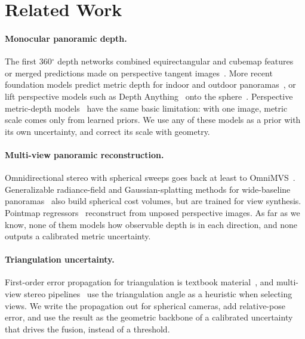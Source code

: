 \section{Related Work}
\label{sec:related}

\paragraph{Monocular panoramic depth.}
The first 360$^\circ$ depth networks combined equirectangular and cubemap
features~\cite{wang2020bifuse,jiang2021unifuse,li2022omnifusion} or merged predictions made on
perspective tangent images~\cite{rey2022360monodepth}. More recent foundation models predict metric
depth for indoor and outdoor panoramas~\cite{lin2026dap,da360}, or lift perspective models such as
Depth Anything~\cite{yang2024depthv2} onto the sphere~\cite{pager2026}. Perspective metric-depth
models~\cite{yin2023metric3d,piccinelli2024unidepth,bochkovskii2025depthpro} have the same basic
limitation: with one image, metric scale comes only from learned priors. We use any of these models as
a prior with its own uncertainty, and correct its scale with geometry.

\paragraph{Multi-view panoramic reconstruction.}
Omnidirectional stereo with spherical sweeps goes back at least to OmniMVS~\cite{won2019omnimvs}.
Generalizable radiance-field and Gaussian-splatting methods for wide-baseline
panoramas~\cite{chen2023panogrf,chen2025splatter360,zhang2024pansplat} also build spherical cost
volumes, but are trained for view synthesis. Pointmap regressors~\cite{wang2024dust3r,leroy2024mast3r,wang2025vggt}
reconstruct from unposed perspective images. As far as we know, none of them models how observable
depth is in each direction, and none outputs a calibrated metric uncertainty.

\paragraph{Triangulation uncertainty.}
First-order error propagation for triangulation is textbook
material~\cite{hartley2003multiple,forstner2016photogrammetric}, and multi-view stereo
pipelines~\cite{schoenberger2016mvs} use the triangulation angle as a heuristic when selecting views.
We write the propagation out for spherical cameras, add relative-pose error, and use the result as the
geometric backbone of a calibrated uncertainty that drives the fusion, instead of a threshold.

